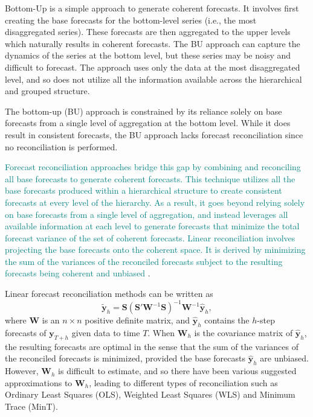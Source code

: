 \documentclass[
  authoryear,
  preprint,
  3p]{elsarticle}
\begin{document}
Bottom-Up is a simple approach to generate coherent forecasts. It
involves first creating the base forecasts for the bottom-level series
(i.e., the most disaggregated series). These forecasts are then
aggregated to the upper levels which naturally results in coherent
forecasts. The BU approach can capture the dynamics of the series at the
bottom level, but these series may be noisy and difficult to forecast.
The approach uses only the data at the most disaggregated level, and so
does not utilize all the information available across the hierarchical
and grouped structure.

The bottom-up (BU) approach is constrained by its reliance solely on
base forecasts from a single level of aggregation at the bottom level.
While it does result in consistent forecasts, the BU approach lacks
forecast reconciliation since no reconciliation is performed.

\textcolor{teal}{Forecast reconciliation approaches bridge this gap by combining and reconciling all base forecasts to generate coherent forecasts. This technique utilizes all the base forecasts produced within a hierarchical structure to create consistent forecasts at every level of the hierarchy. As a result, it goes beyond relying solely on base forecasts from a single level of aggregation, and instead leverages all available information at each level to generate forecasts that minimize the total forecast variance of the set of coherent forecasts.}
\textcolor{teal}{Linear reconciliation involves projecting the base forecasts onto the coherent space. It is derived by minimizing the sum of the variances of the reconciled forecasts subject to the resulting forecasts being coherent and unbiased}
\citep{WicEtAl2019}.

Linear forecast reconciliation methods can be written
\citep{WicEtAl2019} as \[
  \tilde{\bm{y}}_h = \bm{S}(\bm{S}'\bm{W}^{-1}\bm{S})^{-1}\bm{W}^{-1}\hat{\bm{y}}_h,
\] where \(\bm{W}\) is an \(n \times n\) positive definite matrix, and
\(\hat{\bm{y}}_h\) contains the \(h\)-step forecasts of \(\bm{y}_{T+h}\)
given data to time \(T\). When \(\bm{W}_h\) is the covariance matrix of
\(\hat{\bm{y}}_h\), the resulting forecasts are optimal in the sense
that the sum of the variances of the reconciled forecasts is minimized,
provided the base forecasts \(\hat{\bm{y}}_h\) are unbiased. However,
\(\bm{W}_h\) is difficult to estimate, and so there have been various
suggested approximations to \(\bm{W}_h\), leading to different types of
reconciliation such as Ordinary Least Squares (OLS), Weighted Least
Squares (WLS) and Minimum Trace (MinT).
\end{document}
